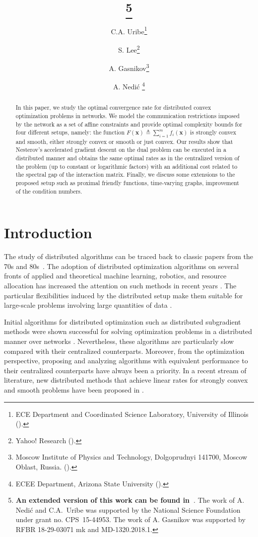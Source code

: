 \documentclass[final]{siamart1116}
\title{{\TheTitle}\thanks{\textbf{An extended version of this work can be found in~\cite{Uribe2018new}}. \newline The work of A. Nedi\'{c} and C.A.\ Uribe was supported by the National Science Foundation under grant no. CPS~15-44953. The work of A. Gasnikov was supported by RFBR 18-29-03071 mk and MD-1320.2018.1.} }
\author{
	C.A. Uribe\thanks{ECE Department and Coordinated Science Laboratory, University of Illinois (\email{cauribe2@illinois.edu}).}
	\and
	S. Lee\thanks{Yahoo! Research  (\email{soominl@yahoo-inc.com}).}
	\and
	A. Gasnikov\thanks{Moscow Institute of Physics and Technology, Dolgoprudnyi 141700, Moscow
		Oblast, Russia.
		(\email{gasnikov@yandex.ru}).} 
	\and
	A. Nedi\'{c} \footnotemark[4] \thanks{ECEE Department, Arizona State University (\email{angelia.nedich@asu.edu}).}
}
\def\xb{\mathbf{x}}
\numberwithin{theorem}{section}
\begin{document}
	\maketitle
	\begin{abstract}
		In this paper, we study the optimal convergence rate for distributed convex optimization problems in networks. We model the communication restrictions imposed by the network as a set of affine constraints and provide optimal complexity bounds for four different setups, namely: the function $F(\xb) \triangleq \sum_{i=1}^{m}f_i(\xb)$ is strongly convex and smooth, either strongly convex or smooth or just convex. Our results show that Nesterov's accelerated gradient descent on the dual problem can be executed in a distributed manner and obtains the same optimal rates as in the centralized version of the problem (up to constant or logarithmic factors) with an additional cost related to the spectral gap of the interaction matrix. Finally, we discuss some extensions to the proposed setup such as proximal friendly functions, time-varying graphs, improvement of the condition numbers.
	\end{abstract}
	
	\section{Introduction}
	
	The study of distributed algorithms can be traced back to classic papers from the 70s and 80s~\cite{aum76,bor82,tsi84,gen86,coo90,deg74,gil93}. The adoption of distributed optimization algorithms on several fronts of applied and theoretical machine learning, robotics, and resource allocation has increased the attention on such methods in recent years \cite{xia06,rab04,kon15,kra13,ned17e}. The particular flexibilities induced by the distributed setup make them suitable for large-scale problems involving large quantities of data  \cite{bot10,boy11,aba16,ned16w,ned15}. 
	
	Initial algorithms for distributed optimization such as distributed subgradient methods were shown successful for solving optimization problems in a distributed manner over networks \cite{ned09,ned09b,ram10,ned13}. Nevertheless, these algorithms are particularly slow compared with their centralized counterparts. Moreover, from the optimization perspective, proposing and analyzing algorithms with equivalent performance to their centralized counterparts have always been a priority. In a recent stream of literature, new distributed methods that achieve linear rates for strongly convex and smooth problems have been proposed in \cite{ned17,ned16w,shi15,lan17,sca17}. 
	
\end{document}
